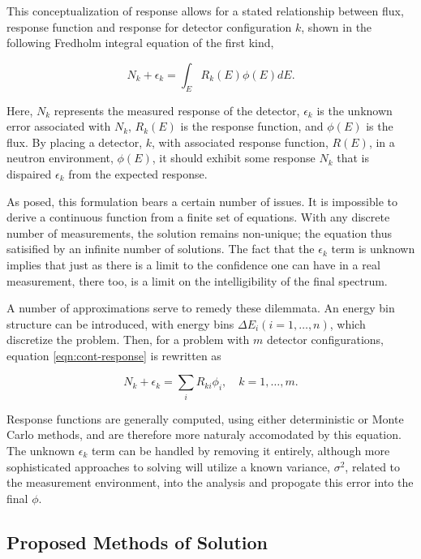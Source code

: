 This conceptualization of response allows for a stated relationship between flux, response function and response for detector configuration $k$, shown in the following Fredholm integral equation of the first kind,

\begin{equation}\label{eqn:cont-response}
N_k + \epsilon_k = \int_E R_k(E) \phi(E) dE .
\end{equation}

Here, $N_k$ represents the measured response of the detector, $\epsilon_k$ is the unknown error associated with $N_k$, $R_k(E)$ is the response function, and $\phi(E)$ is the flux.
By placing a detector, $k$, with associated response function, $R(E)$, in a neutron environment, $\phi(E)$, it should exhibit some response $N_k$ that is dispaired $\epsilon_k$ from the expected response.

As posed, this formulation bears a certain number of issues.
It is impossible to derive a continuous function from a finite set of equations.
With any discrete number of measurements, the solution remains non-unique; the equation thus satisified by an infinite number of solutions.
The fact that the $\epsilon_k$ term is unknown implies that just as there is a limit to the confidence one can have in a real measurement, there too, is a limit on the intelligibility of the final spectrum.

A number of approximations serve to remedy these dilemmata.
An energy bin structure can be introduced, with energy bins $\Delta E_i (i = 1, \ldots, n)$, which discretize the problem.
Then, for a problem with $m$ detector configurations, equation \ref{eqn:cont-response} is rewritten as

\begin{equation}\label{eqn:disc-response}
N_k + \epsilon_k = \sum_i R_{ki} \phi_i, \quad k = 1,\ldots, m .
\end{equation}

Response functions are generally computed, using either deterministic or Monte Carlo methods, and are therefore more naturaly accomodated by this equation.
The unknown $\epsilon_k$ term can be handled by removing it entirely, although more sophisticated approaches to solving will utilize a known variance, $\sigma^2$, related to the measurement environment, into the analysis and propogate this error into the final $\phi$.


\subsection{Proposed Methods of Solution}

